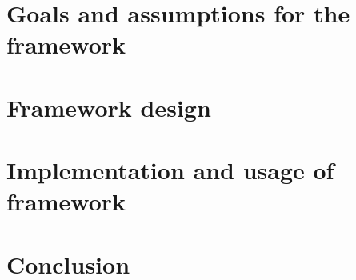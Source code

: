 \documentclass[12pt,twoside]{report}
\begin{document}



\tableofcontents



\chapter{Goals and assumptions for the framework}


\chapter{Framework design}


\chapter{Implementation and usage of framework}


\chapter{Conclusion}


\printbibliography\
\end{document}
